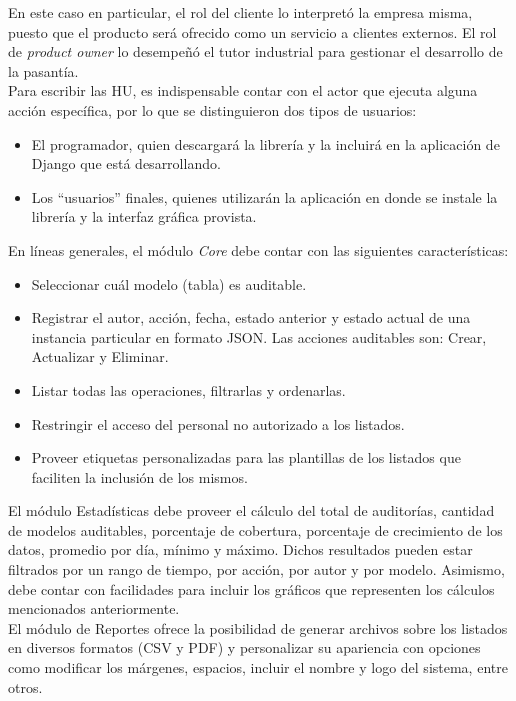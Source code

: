 En este caso en particular, el rol del cliente lo interpretó la empresa misma, puesto que el producto será ofrecido como un servicio a clientes externos. El rol de \textit{product owner} lo desempeñó el tutor industrial para gestionar el desarrollo de la pasantía. \\

Para escribir las HU, es indispensable contar con el actor que ejecuta alguna acción específica, por lo que se distinguieron dos tipos de usuarios:

\begin{itemize}
    \item El programador, quien descargará la librería y la incluirá en la aplicación de Django que está desarrollando.
    \item Los “usuarios” finales, quienes utilizarán la aplicación en donde se instale la librería y la interfaz gráfica provista.
\end{itemize}

En líneas generales, el módulo \textit{Core} debe contar con las siguientes características:

\begin{itemize}
    \item Seleccionar cuál modelo (tabla) es auditable.
    \item Registrar el autor, acción, fecha, estado anterior y estado actual de una instancia particular en formato JSON. Las acciones auditables son: Crear, Actualizar y Eliminar.
    \item Listar todas las operaciones, filtrarlas y ordenarlas.
    \item Restringir el acceso del personal no autorizado a los listados.
    \item Proveer etiquetas personalizadas para las plantillas de los listados que faciliten la inclusión de los mismos.
\end{itemize}

El módulo Estadísticas debe proveer el cálculo del total de auditorías, cantidad de modelos auditables, porcentaje de cobertura, porcentaje de crecimiento de los datos, promedio por día, mínimo y máximo. Dichos resultados pueden estar filtrados por un rango de tiempo, por acción, por autor y por modelo. Asimismo, debe contar con facilidades para incluir los gráficos que representen los cálculos mencionados anteriormente. \\

El módulo de Reportes ofrece la posibilidad de generar archivos sobre los listados en diversos formatos (CSV y PDF) y personalizar su apariencia con opciones como modificar los márgenes, espacios, incluir el nombre y logo del sistema, entre otros. \\

